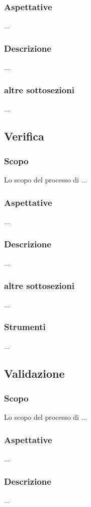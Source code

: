     \subsubsection{Aspettative}
        ...
    \subsubsection{Descrizione}
        ...
    \subsubsection{altre sottosezioni}
        ...

\subsection{Verifica} %
\label{verifica}
    \subsubsection{Scopo}
        Lo scopo del processo di ...
    \subsubsection{Aspettative}
        ...
    \subsubsection{Descrizione}
        ...
    \subsubsection{altre sottosezioni}
        ...
    \subsubsection{Strumenti}
        ...


\subsection{Validazione} %
    \subsubsection{Scopo}
        Lo scopo del processo di ...
    \subsubsection{Aspettative}
        ...
    \subsubsection{Descrizione}
        ...
